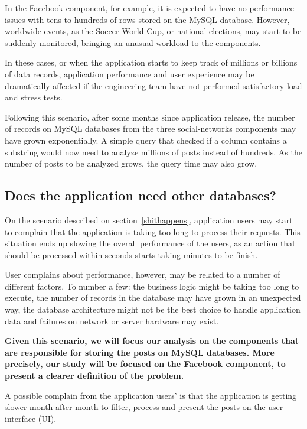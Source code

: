 In the Facebook component, for example, it is expected to have no performance issues with tens to hundreds of rows stored on the MySQL database. However, worldwide events, as the Soccer World Cup, or national elections, may start to be suddenly monitored, bringing an unusual workload to the components.  

In these cases, or when the application starts to keep track of millions or billions of data records, application performance and user experience may  be dramatically affected if the engineering team have not performed satisfactory load and stress tests.   

Following this scenario, after some months since application release, the number of records on MySQL databases from the three social-networks components may have grown exponentially. A simple query that checked if a column contains a substring would now need to analyze millions of posts instead of hundreds. As the number of posts to be analyzed grows, the query time may also grow.

\subsection{Does the application need other databases?}
\label{anotherdb}
On the scenario described on section~\ref{shithappens}, application users may start to complain that the application is taking too long to process their requests. This situation ends up slowing the overall performance of the users, as an action that should be processed within seconds starts taking minutes to be finish.  

User complains about performance, however, may be related to a number of different factors. To number a few: the business logic might be taking too long to execute, the number of records in the database may have grown in an unexpected way, the database architecture might not be the best choice to handle application data and failures on network or server hardware may exist. 

\textbf{Given this scenario, we will focus our analysis on the components that are responsible for storing the posts on MySQL databases. More precisely, our study will be focused on the Facebook component, to present a clearer definition of the problem.}

A possible complain from the application users' is that the application is getting slower month after month to filter, process and present the posts on  the user interface (UI). 

